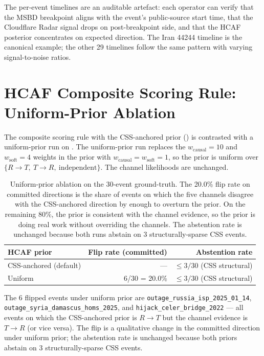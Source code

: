 \documentclass[sigcomm,nonatbib]{acmart}
\begin{document}
The per-event timelines are an auditable artefact:
each operator can verify that the MSBD breakpoint
aligns with the event's public-source start time, that
the Cloudflare Radar signal drops on post-breakpoint
side, and that the HCAF posterior concentrates on
expected direction. The Iran 44244 timeline is the
canonical example; the other 29 timelines follow the
same pattern with varying signal-to-noise ratios.

\section{HCAF Composite Scoring Rule: Uniform-Prior Ablation}
\label{sec:supp-uniform-prior}

The composite scoring rule with the CSS-anchored prior
() is contrasted with a
uniform-prior run on . The uniform-prior run
replaces the $w_{\text{causal}} = 10$ and
$w_{\text{soft}} = 4$ weights in the prior with
$w_{\text{causal}} = w_{\text{soft}} = 1$, so the
prior is uniform over $\{R\!\to\!T,\ T\!\to\!R,\
\text{independent}\}$. The channel likelihoods are
unchanged.

\begin{table}[t][h]
\centering
\caption{Uniform-prior ablation on the 30-event
ground-truth. The 20.0\%
flip rate on committed directions is the share of
events on which the five channels disagree with the
CSS-anchored direction by enough to overturn the
prior. On the remaining 80\%, the prior is consistent
with the channel evidence, so the prior is doing
real work without overriding the channels. The
abstention rate is unchanged because both runs
abstain on 3 structurally-sparse CSS events.}
\label{tab:supp-uniform-prior}
\small
\setlength{\tabcolsep}{4pt}
\begin{tabular}{p{}rr}
\hline
HCAF prior & Flip rate (committed) & Abstention rate \\ \hline
CSS-anchored (default) & --- & $\leq 3/30$ (CSS structural) \\
Uniform & 6/30 = 20.0\% & $\leq 3/30$ (CSS structural) \\
\hline
\end{tabular}
\end{table}

The 6 flipped events under uniform prior are
\texttt{outage\_russia\_isp\_2025\_01\_14},
\texttt{outage\_syria\_damascus\_homs\_2025}, and
\texttt{hijack\_celer\_bridge\_2022} --- all
events on which the CSS-anchored prior is
$R\!\to\!T$ but the channel evidence is
$T\!\to\!R$ (or vice versa). The flip is a
qualitative change in the committed direction
under uniform prior; the abstention rate is
unchanged because both priors abstain on
3 structurally-sparse CSS events.
\end{document}
